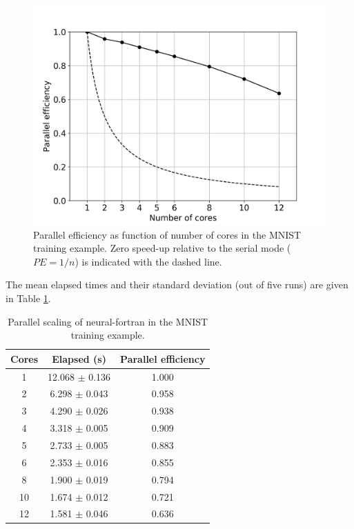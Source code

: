 \documentclass[sigplan, review=false, screen=true, balance=true]{acmart}
\begin{document}
\begin{figure}[H]
  \centering
  \includegraphics[width=\columnwidth]{../figures/nf-parallel-efficiency.png}
  \caption{Parallel efficiency as function of number of cores in the MNIST training example.
	   Zero speed-up relative to the serial mode ($PE = 1/n$) is indicated with the dashed line.}
  \label{fig_mnist_efficiency}
\end{figure}

The mean elapsed times and their standard deviation (out of five runs) are
given in Table \ref{table_parallel}.

\begin{center}
\begin{table}[h]
\caption{Parallel scaling of neural-fortran in the MNIST training example.}
\label{table_parallel}
\begin{tabular}{c|c|c}
  \hline
  Cores & Elapsed (s) & Parallel efficiency \\
  \hline
  1 & 12.068 $\pm$ 0.136 & 1.000 \\
  2 & 6.298 $\pm$ 0.043 & 0.958 \\
  3 & 4.290 $\pm$ 0.026 & 0.938 \\
  4 & 3.318 $\pm$ 0.005 & 0.909 \\
  5 & 2.733 $\pm$ 0.005 & 0.883 \\
  6 & 2.353 $\pm$ 0.016 & 0.855 \\
  8 & 1.900 $\pm$ 0.019 & 0.794 \\
  10 & 1.674 $\pm$ 0.012 & 0.721 \\
  12 & 1.581 $\pm$ 0.046 & 0.636 \\
  \hline
\end{tabular}
\end{table}
\end{center}
\end{document}

